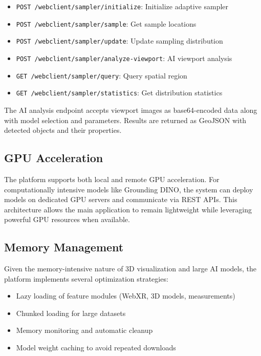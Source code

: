 \documentclass[conference]{IEEEtran}
\begin{document}
\begin{itemize}
    \item \texttt{POST /webclient/sampler/initialize}: Initialize adaptive sampler
    \item \texttt{POST /webclient/sampler/sample}: Get sample locations
    \item \texttt{POST /webclient/sampler/update}: Update sampling distribution
    \item \texttt{POST /webclient/sampler/analyze-viewport}: AI viewport analysis
    \item \texttt{GET /webclient/sampler/query}: Query spatial region
    \item \texttt{GET /webclient/sampler/statistics}: Get distribution statistics
\end{itemize}

The AI analysis endpoint accepts viewport images as base64-encoded data along with model selection and parameters. Results are returned as GeoJSON with detected objects and their properties.

\subsection{GPU Acceleration}

The platform supports both local and remote GPU acceleration. For computationally intensive models like Grounding DINO, the system can deploy models on dedicated GPU servers and communicate via REST APIs. This architecture allows the main application to remain lightweight while leveraging powerful GPU resources when available.

\subsection{Memory Management}

Given the memory-intensive nature of 3D visualization and large AI models, the platform implements several optimization strategies:

\begin{itemize}
    \item Lazy loading of feature modules (WebXR, 3D models, measurements)
    \item Chunked loading for large datasets
    \item Memory monitoring and automatic cleanup
    \item Model weight caching to avoid repeated downloads
\end{itemize}
\end{document}
